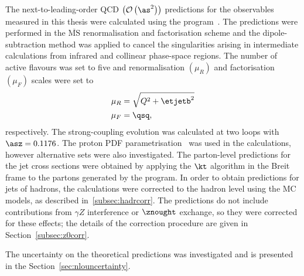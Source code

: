 The next-to-leading-order QCD $ \left( \mathcal{O}\left( \as^2\right) \right) $ predictions for the observables measured in this thesis were calculated using the \nlojet program~\cite{Nagy:1998bb, Nagy:2001xb}. The predictions were performed in the $\overline{\text{MS}}$ renormalisation and factorisation scheme and the dipole-subtraction method was applied to cancel the singularities arising in intermediate calculations from infrared and collinear phase-space regions. The number of active flavours was set to five and renormalisation $\left( \mu_R \right) $ and factorisation $\left( \mu_F \right) $ scales were set to 
\begin{align}
\mu_R &= \sqrt{Q^2+\etjetb^2}\\
\mu_F &= \qsq,
\end{align}
respectively. The strong-coupling evolution was calculated at two loops with $\asz=0.1176$. The  proton PDF parametrisation~\cite{upub:herapdf1.5} was used in the calculations, however alternative sets were also investigated. The parton-level predictions for the jet cross sections were obtained by applying the $\kt$ algorithm in the Breit frame to the partons generated by the program. In order to obtain predictions for jets of hadrons, the calculations were corrected to the hadron level using the MC models, as described in~\ref{subsec:hadrcorr}. The predictions do not include contributions from $\gamma Z$ interference or $\znought$ exchange, so they were corrected for these effects; the details of the correction procedure are given in Section~\ref{subsec:z0corr}. 

The uncertainty on the theoretical predictions was investigated and is presented in the Section~\ref{sec:nlouncertainty}.